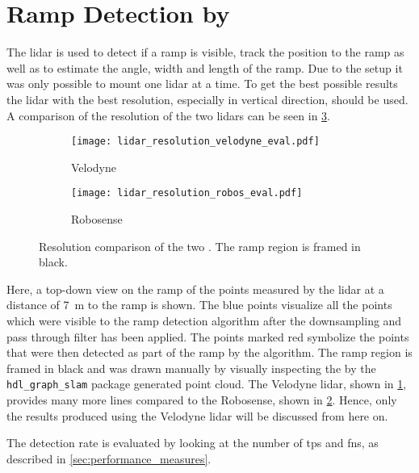 \section{Ramp Detection by }
\label{sec:eval_lidar}
The \gls{lidar} is used to detect if a ramp is visible, track the position to the ramp as well as to estimate the angle, width and length of the ramp.
Due to the setup it was only possible to mount one \gls{lidar} at a time.
To get the best possible results the \gls{lidar} with the best resolution, especially in vertical direction, should be used.
A comparison of the resolution of the two \glspl{lidar} can be seen in \cref{fig:lidar_resolution_eval}.
\begin{figure}[htb]
    \centering
    \begin{subfigure}{1\textwidth}
        \centering
        \texttt{[image: lidar\_resolution\_velodyne\_eval.pdf]}
        \caption{Velodyne}
        \label{fig:lidar_resolution_velodyne_eval}
    \end{subfigure}
    
    \begin{subfigure}{1\textwidth}
        \centering
        \texttt{[image: lidar\_resolution\_robos\_eval.pdf]}
        \caption{Robosense}
        \label{fig:lidar_resolution_robos_eval}
    \end{subfigure}
    \caption[Resolution comparison of the two ]{Resolution comparison of the two . The ramp region is framed in black.}
    \label{fig:lidar_resolution_eval}
\end{figure}
Here, a top-down view on the ramp of the points measured by the \gls{lidar} at a distance of \SI{7}{\metre} to the ramp is shown.
The blue points visualize all the points which were visible to the ramp detection algorithm after the downsampling and pass through filter has been applied.
The points marked red symbolize the points that were then detected as part of the ramp by the algorithm.
The ramp region is framed in black and was drawn manually by visually inspecting the by the \texttt{hdl\_graph\_slam} package generated point cloud.
The Velodyne \gls{lidar}, shown in \cref{fig:lidar_resolution_velodyne_eval}, provides many more lines compared to the Robosense, shown in \cref{fig:lidar_resolution_robos_eval}.
Hence, only the results produced using the Velodyne \gls{lidar} will be discussed from here on.\par
The detection rate is evaluated by looking at the number of \glspl{tp} and \glspl{fn}, as described in \cref{sec:performance_measures}.
